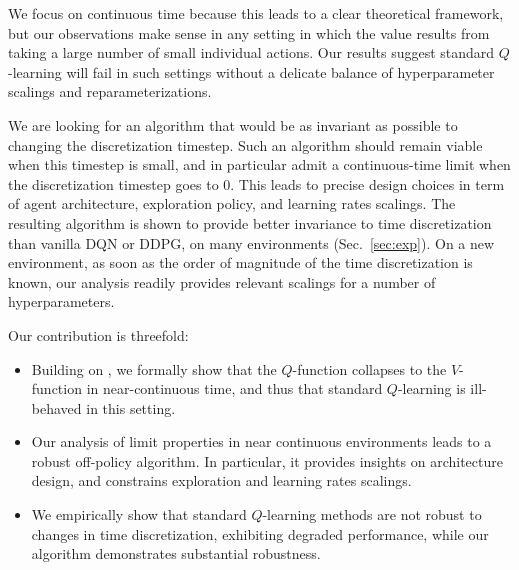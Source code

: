We focus on continuous time because this leads to a clear theoretical framework,
but our observations make sense in any setting in which the value
results from taking a large number of small individual actions. Our
results suggest standard $Q$-learning will fail in such settings without a
delicate balance of hyperparameter scalings and reparameterizations.

We are looking for an algorithm that would be as invariant as possible to
changing the discretization timestep. Such an 
algorithm should remain viable when this timestep is small, and in particular admit a
continuous-time
limit when the discretization timestep goes to $0$.  This
leads to precise design choices in term of agent architecture, exploration
policy, and learning rates scalings.  The resulting algorithm is shown to
provide better invariance to time discretization than
vanilla DQN or DDPG, on many environments (Sec.~\ref{sec:exp}).  On a new environment, as soon as the
order of magnitude of the time discretization is known, our analysis readily
provides relevant scalings for a number of hyperparameters.


Our contribution is threefold:
\begin{itemize} 
\item Building on \cite{adv_upd}, we formally show that the $Q$-function collapses to the $V$-function in near-continuous time, and thus that
    standard $Q$-learning is ill-behaved in this setting.
  \item Our analysis of limit properties in near continuous environments leads to a robust off-policy algorithm. In particular,
    it provides insights on architecture design, and constrains
    exploration and learning rates scalings.
  \item We empirically show that standard $Q$-learning methods are not
  robust to changes in time discretization, exhibiting degraded
  performance, while our algorithm demonstrates
  substantial robustness.
\end{itemize}


